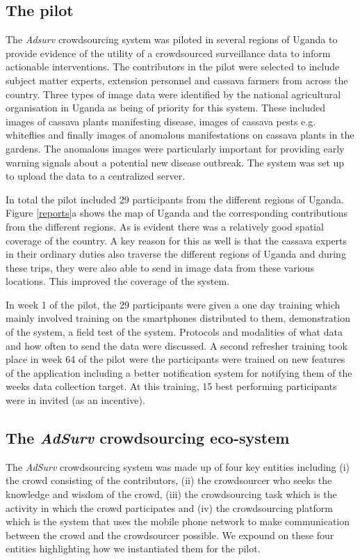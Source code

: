 \documentclass[letterpaper]{article} %
\begin{document}
\subsection{The pilot}
The \emph{Adsurv} crowdsourcing system was piloted in several regions of Uganda to provide evidence of the utility of a crowdsourced surveillance data to inform actionable interventions. The contributors in the pilot were selected to include subject matter experts, extension personnel and cassava farmers from across the country. Three types of image data were identified by the national agricultural organisation in Uganda as being of priority for this system. These included images of cassava plants manifesting disease, images of cassava pests e.g. whiteflies and finally images of anomalous manifestations on cassava plants in the gardens. The anomalous images were particularly important for providing early warning signals about a potential new disease outbreak. The system was set up to upload the data to a centralized server.

In total the pilot included 29 participants from the different regions of Uganda. Figure \ref{reports}a shows the map of Uganda and the corresponding contributions from the different regions. As is evident there was a relatively good spatial coverage of the country. A key reason for this as well is that the cassava experts in their ordinary duties also traverse the different regions of Uganda and during these trips, they were also able to send in image data from these various locations. This improved the coverage of the system.

In week 1 of the pilot, the 29 participants were given a one day training which mainly involved training on the smartphones distributed to them, demonstration of the system, a field test of the system. Protocols and modalities of what data and how often to send the data were discussed. A second refresher training took place in week 64 of the pilot were the participants were trained on new features of the application including a better notification system for notifying them of the weeks data collection target. At this training, 15 best performing participants were in invited (as an incentive).

\subsection{The \emph{AdSurv} crowdsourcing eco-system}
The \emph{AdSurv} crowdsourcing system was made up of four key entities including (i) the crowd consisting of the contributors, (ii) the crowdsourcer who seeks the knowledge and wisdom of the crowd, (iii) the crowdsourcing task which is the activity in which the crowd participates and (iv) the crowdsourcing platform which is the system that uses the mobile phone network to make communication between the crowd and the crowdsourcer possible. We expound on these four entities highlighting how we instantiated them for the pilot.
\end{document}
